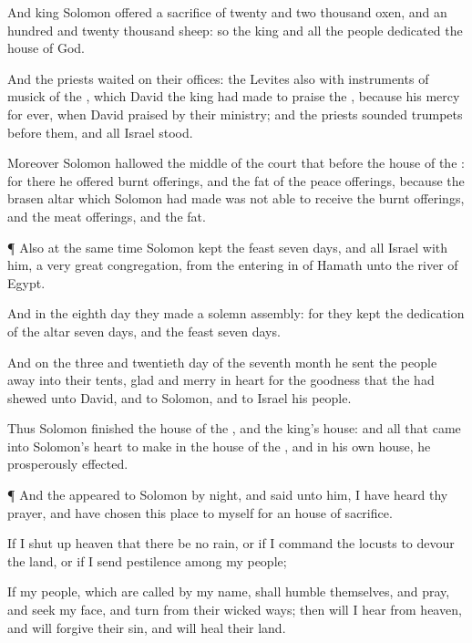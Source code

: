 {And
king
Solomon
offered a
sacrifice of
twenty and
two
thousand
oxen, and an
hundred and
twenty
thousand
sheep: so the
king and all the
people
dedicated the
house of
God.

And the
priests
waited on their
offices: the
Levites also with
instruments of
musick of the
{}, which
David the
king had
made to
praise the
{}, because his
mercy
{} for
ever, when
David
praised by their
ministry; and the
priests sounded
trumpets before them, and all
Israel
stood.

Moreover
Solomon
hallowed the
middle of the
court that
{}
before the
house of the
{}: for there he
offered burnt
offerings, and the
fat of the peace
offerings, because the
brasen
altar which
Solomon had
made was not
able to
receive the burnt
offerings, and the meat
offerings, and the
fat.


\par }{\PP {}¶ Also at the same
time
Solomon
kept the
feast
seven
days, and all
Israel with him, a
very
great
congregation, from the entering
in of
Hamath unto the
river of
Egypt.

And in the
eighth
day they
made a solemn
assembly: for they
kept the
dedication of the
altar
seven
days, and the
feast
seven
days.

And on the
three and
twentieth
day of the
seventh
month he
sent the
people
away into their
tents,
glad and
merry in
heart for the
goodness that the
{} had
shewed unto
David, and to
Solomon, and to
Israel his
people.

Thus
Solomon
finished the
house of the
{}, and the
king’s
house: and all that
came into
Solomon’s
heart to
make in the
house of the
{}, and in his own
house, he prosperously
effected.


\par }{\PP {}¶ And the
{}
appeared to
Solomon by
night, and
said unto him, I have
heard thy
prayer, and have
chosen this
place to myself for an
house of
sacrifice.

If I shut
up
heaven that there be no
rain, or if I
command the
locusts to
devour the
land, or if I
send
pestilence among my
people;

If my
people, which are
called by my
name, shall
humble themselves, and
pray, and
seek my
face, and
turn from their
wicked
ways; then will I
hear from
heaven, and will
forgive their
sin, and will
heal their
land.

}

